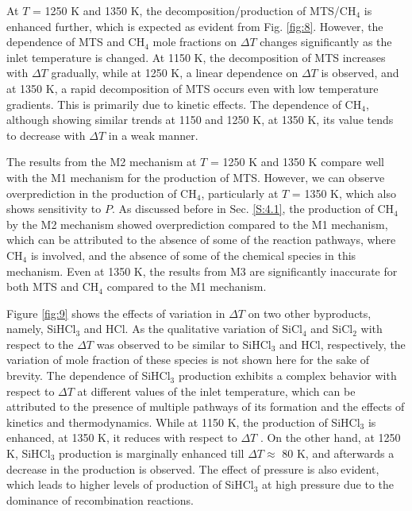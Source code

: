\documentclass[final, letterpaper, square, comma, numbers, sort&compress]{elsarticle}
\begin{document}
At $T$ = 1250 K and 1350 K, the decomposition/production of MTS/CH$_4$ is enhanced further, which is expected as evident from Fig. \ref{fig:8}. However, the dependence of MTS and CH$_4$ mole fractions on $\Delta T$ changes significantly as the inlet temperature is changed. At 1150 K, the decomposition of MTS increases with $\Delta T$ gradually, while at 1250 K, a linear dependence on $\Delta T$ is observed, and at 1350 K, a rapid decomposition of MTS occurs even with low temperature gradients. This is primarily due to kinetic effects. The dependence of CH$_4$, although showing similar trends at 1150 and 1250 K, at 1350 K, its value tends to decrease with $\Delta T$ in a weak manner.

The results from the M2 mechanism at $T$ = 1250 K and 1350 K compare well with the M1 mechanism for the production of MTS. However, we can observe overprediction in the production of CH$_4$, particularly at $T$ = 1350 K, which also shows sensitivity to $P$. As discussed before in Sec. \ref{S:4.1}, the production of CH$_4$ by the M2 mechanism showed overprediction compared to the M1 mechanism, which can be attributed to the absence of some of the reaction pathways, where CH$_4$ is involved, and the absence of some of the chemical species in this mechanism. Even at 1350 K, the results from M3 are significantly inaccurate for both MTS and CH$_4$ compared to the M1 mechanism.

Figure \ref{fig:9} shows the effects of variation in $\Delta T$ on two other byproducts, namely, SiHCl$_3$ and HCl. As the qualitative variation of SiCl$_4$ and SiCl$_2$ with respect to the $\Delta T$ was observed to be similar to SiHCl$_3$ and HCl, respectively, the variation of mole fraction of these species is not shown here for the sake of brevity. The dependence of SiHCl$_3$ production exhibits a complex behavior with respect to $\Delta T$ at different values of the inlet temperature, which can be attributed to the presence of multiple pathways of its formation and the effects of kinetics and thermodynamics. While at 1150 K, the production of SiHCl$_3$ is enhanced, at 1350 K, it reduces with respect to $\Delta T$ . On the other hand, at 1250 K, SiHCl$_3$ production is marginally enhanced till $\Delta T \approx$ 80 K, and afterwards a decrease in the production is observed. The effect of pressure is also evident, which leads to higher levels of production of SiHCl$_3$ at high pressure due to the dominance of recombination reactions.
\end{document}
